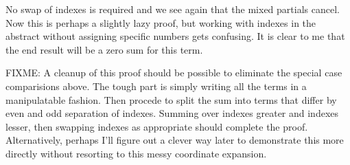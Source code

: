 \documentclass{article}
\begin{document}
No swap of indexes is required and we see again that the mixed partials cancel.  Now this is perhaps a slightly lazy proof, but working with
indexes in the abstract without assigning specific numbers gets confusing.  It is clear to me that the end result will be a zero sum for this term.

FIXME: A cleanup of this proof should be possible to eliminate the special case comparisions above.  The tough part is simply writing all the terms
in a manipulatable fashion.  Then procede to split the sum into terms that differ by even and odd separation of indexes.  Summing over indexes greater and indexes lesser, then swapping indexes as appropriate should complete the proof.
Alternatively, perhaps I'll figure out a clever way later to demonstrate this more directly without resorting to this messy coordinate expansion.
\end{document}

